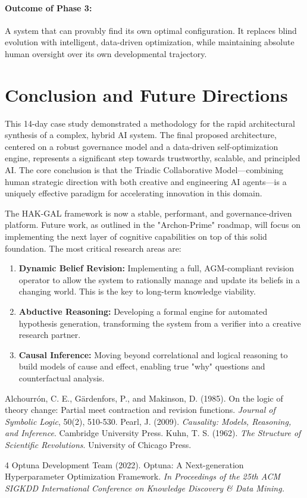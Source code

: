 \documentclass[11pt, a4paper]{article}
\begin{document}
\paragraph{Outcome of Phase 3:} A system that can provably find its own optimal configuration. It replaces blind evolution with intelligent, data-driven optimization, while maintaining absolute human oversight over its own developmental trajectory.

\section{Conclusion and Future Directions}
\label{sec:conclusion}

This 14-day case study demonstrated a methodology for the rapid architectural synthesis of a complex, hybrid AI system. The final proposed architecture, centered on a robust governance model and a data-driven self-optimization engine, represents a significant step towards trustworthy, scalable, and principled AI. The core conclusion is that the Triadic Collaborative Model—combining human strategic direction with both creative and engineering AI agents—is a uniquely effective paradigm for accelerating innovation in this domain.

The HAK-GAL framework is now a stable, performant, and governance-driven platform. Future work, as outlined in the "Archon-Prime" roadmap, will focus on implementing the next layer of cognitive capabilities on top of this solid foundation. The most critical research areas are:
\begin{enumerate}
    \item \textbf{Dynamic Belief Revision:} Implementing a full, AGM-compliant revision operator to allow the system to rationally manage and update its beliefs in a changing world. This is the key to long-term knowledge viability.
    \item \textbf{Abductive Reasoning:} Developing a formal engine for automated hypothesis generation, transforming the system from a verifier into a creative research partner.
    \item \textbf{Causal Inference:} Moving beyond correlational and logical reasoning to build models of cause and effect, enabling true "why" questions and counterfactual analysis.
\end{enumerate}

\begin{thebibliography}{9}
     Alchourrón, C. E., Gärdenfors, P., and Makinson, D. (1985). On the logic of theory change: Partial meet contraction and revision functions. \textit{Journal of Symbolic Logic}, 50(2), 510-530.
     Pearl, J. (2009). \textit{Causality: Models, Reasoning, and Inference}. Cambridge University Press.
     Kuhn, T. S. (1962). \textit{The Structure of Scientific Revolutions}. University of Chicago Press.
    \item[4] Optuna Development Team (2022). Optuna: A Next-generation Hyperparameter Optimization Framework. \textit{In Proceedings of the 25th ACM SIGKDD International Conference on Knowledge Discovery & Data Mining.}
\end{thebibliography}
\end{document}
